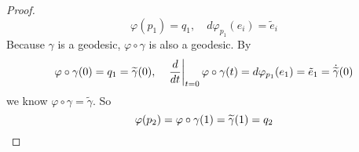 \begin{enumerate}[label=\arabic{*}.]
\begin{proof}
		\begin{equation*}
			\varphi(p_1)=q_1,\quad d\varphi_{p_1}(e_i) = \tilde{e}_i
		\end{equation*}
		Because $\gamma$ is a geodesic, $\varphi \circ\gamma$ is also a geodesic. By
		\begin{equation*}
			\varphi \circ\gamma(0) = q_1 = \widetilde{\gamma}(0),\quad \left.\frac{d}{dt}\right\lvert_{t=0}\varphi \circ\gamma(t) = d\varphi_{p_1}(e_1) = \tilde{e}_1 = \dot{\widetilde{\gamma}}(0)
		\end{equation*}
		we know $\varphi \circ\gamma = \widetilde{\gamma}$. So
		\begin{equation*}
			\varphi(p_2) = \varphi \circ\gamma(1) = \widetilde{\gamma}(1) = q_2 \qedhere
		\end{equation*}
	\end{proof}


\end{enumerate}
